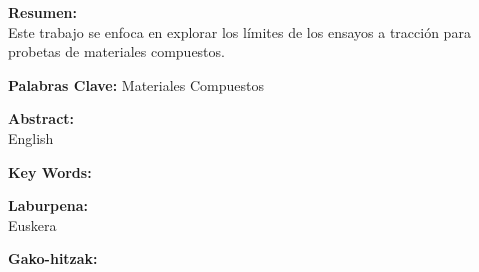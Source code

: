 \begin{itshape}
    \textbf{Resumen:} \\
    Este trabajo se enfoca en explorar los límites de los ensayos a tracción para probetas de materiales compuestos.

    
    \textbf{Palabras Clave:} Materiales Compuestos
\end{itshape}
\newpage

\begin{itshape}
    \textbf{Abstract:} \\
    English


    \textbf{Key Words:}
\end{itshape}
\newpage

\begin{itshape}
    \textbf{Laburpena:} \\
    Euskera

    
    \textbf{Gako-hitzak:}
\end{itshape}
\newpage
